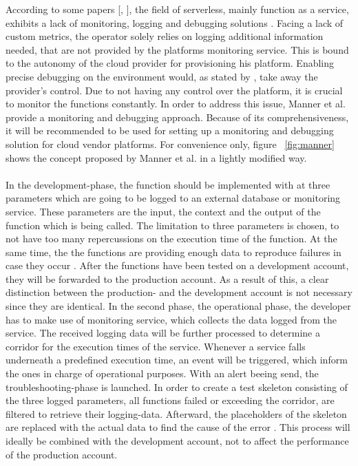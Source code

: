 \documentclass[11pt]{article}
\begin{document}
According to some papers [\cite{roberts2017serverless}, \cite{baldini2017serverless}], the field of serverless, mainly function as a service, exhibits a lack of monitoring, logging and debugging solutions \cite{kritikos2018review}. Facing a lack of custom metrics, the operator solely relies on logging additional information needed, that are not provided by the platforms monitoring service. This is bound to the autonomy of the cloud provider for provisioning his platform. Enabling precise debugging on the environment would, as stated by \cite{manner2019troubleshooting}, take away the provider's control. Due to not having any control over the platform, it is crucial to monitor the functions constantly. In order to address this issue, Manner et al. provide a monitoring and debugging approach. Because of its comprehensiveness, it will be recommended to be used for setting up a monitoring and debugging solution for cloud vendor platforms. For convenience only, figure ~\ref{fig:manner} shows the concept proposed by Manner et al. in a lightly modified way.\\\\ In the development-phase, the function should be implemented with at three parameters which are going to be logged to an external database or monitoring service. These parameters are the input, the context and the output of the function which is being called. The limitation to three parameters is chosen, to not have too many repercussions on the execution time of the function. At the same time, the the functions are providing enough data to reproduce failures in case they occur \cite{manner2019troubleshooting}. After the functions have been tested on a development account, they will be forwarded to the production account. As a result of this, a clear distinction between the production- and the development account is not necessary since they are identical. In the second phase, the operational phase, the developer has to make use of monitoring service, which collects the data logged from the service. The received logging data will be further processed to determine a corridor for the execution times of the service. Whenever a service falls underneath a predefined execution time, an event will be triggered, which inform the ones in charge of operational purposes. With an alert beeing send, the troubleshooting-phase is launched. In order to create a test skeleton consisting of the three logged parameters, all functions failed or exceeding the corridor, are filtered to retrieve their logging-data. Afterward, the placeholders of the skeleton are replaced with the actual data to find the cause of the error \cite{manner2019troubleshooting}.  This process will ideally be combined with the development account, not to affect the performance of the production account.\\\\ %
\end{document}
